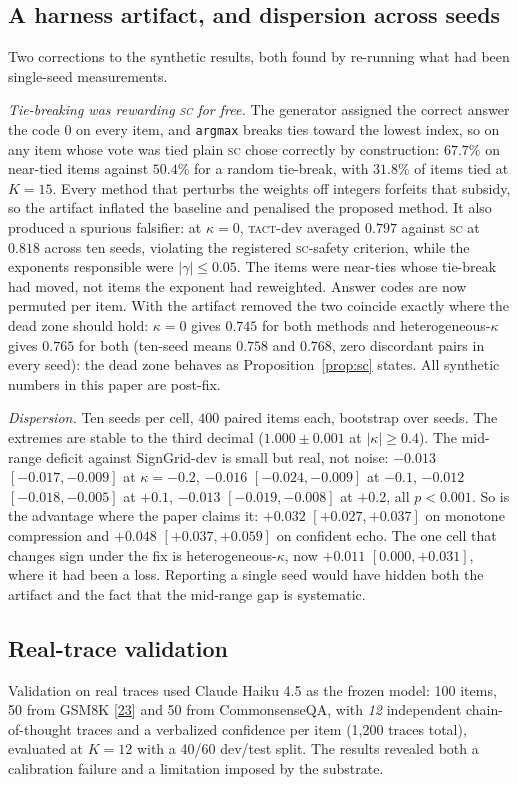 \documentclass[conference]{IEEEtran}
\newcommand{\SC}{\textsc{sc}}
\newcommand{\TACT}{\textsc{tact}}
\begin{document}
\subsection{A harness artifact, and dispersion across seeds}\label{sec:seeds}
Two corrections to the synthetic results, both found by re-running what had
been single-seed measurements.

\emph{Tie-breaking was rewarding \SC{} for free.} The generator assigned the
correct answer the code $0$ on every item, and \texttt{argmax} breaks ties
toward the lowest index, so on any item whose vote was tied plain \SC{} chose
correctly by construction: $67.7\%$ on near-tied items against $50.4\%$ for a
random tie-break, with $31.8\%$ of items tied at $K{=}15$. Every method that
perturbs the weights off integers forfeits that subsidy, so the artifact
inflated the baseline and penalised the proposed method. It also produced a
spurious falsifier: at $\kappa=0$, \TACT-dev averaged $0.797$ against \SC{} at
$0.818$ across ten seeds, violating the registered \SC{}-safety criterion, while the exponents responsible were
$|\gamma|\le0.05$. The items were near-ties whose tie-break had moved, not
items the exponent had reweighted. Answer codes are now permuted per item.
With the artifact removed the two coincide exactly where the dead zone
should hold: $\kappa=0$ gives $0.745$ for both methods and
heterogeneous-$\kappa$ gives $0.765$ for both (ten-seed means $0.758$ and
$0.768$, zero discordant pairs in every seed): the dead zone behaves as
Proposition~\ref{prop:sc} states. All synthetic numbers in this paper are
post-fix.

\emph{Dispersion.} Ten seeds per cell, $400$ paired items each, bootstrap over
seeds. The extremes are stable to the third decimal ($1.000\pm0.001$ at
$|\kappa|\ge0.4$). The mid-range deficit against SignGrid-dev is small but
real, not noise: $-0.013$ $[-0.017,-0.009]$ at $\kappa=-0.2$, $-0.016$
$[-0.024,-0.009]$ at $-0.1$, $-0.012$ $[-0.018,-0.005]$ at $+0.1$, $-0.013$
$[-0.019,-0.008]$ at $+0.2$, all $p<0.001$. So is the advantage where the
paper claims it: $+0.032$ $[+0.027,+0.037]$ on monotone compression and
$+0.048$ $[+0.037,+0.059]$ on confident echo. The one cell that changes sign
under the fix is heterogeneous-$\kappa$, now $+0.011$ $[0.000,+0.031]$, where it had
been a loss. Reporting a single seed would have hidden both the artifact and
the fact that the mid-range gap is systematic.


\subsection{Real-trace validation}\label{sec:real}
Validation on real traces used Claude Haiku 4.5 as the frozen model: 100 items, 50 from
GSM8K [\hyperlink{bib:gsm8k2021}{23}] and 50 from CommonsenseQA, with \emph{12} independent
chain-of-thought traces and a verbalized confidence per item (1{,}200 traces
total), evaluated at $K{=}12$ with a 40/60 dev/test split. The results revealed
both a calibration failure and a limitation imposed by the substrate.
\end{document}

